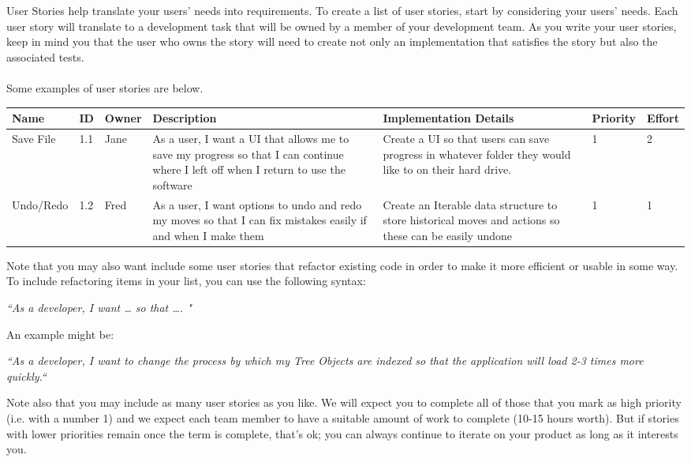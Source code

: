 \documentclass[12pt]{article}
\begin{document}
User Stories help translate your users’ needs into requirements. To create a list of user stories, start by considering your users’ needs. Each user story will translate to a development task that will be owned by a member of your development team. As you write your user stories, keep in mind you that the user who owns the story will need to create not only an implementation that satisfies the story but also the associated tests.\\
\\
Some examples of user stories are below.
    \begin{center}
      \begin{tabular}{|p{2cm}|p{0.5cm}|p{1.5cm}|p{3cm}|p{3.5cm}|p{1.75cm}|p{1.25cm}|}
        \hline
        \textbf{Name}&\textbf{ID} &\textbf{Owner}&\textbf{Description}&\textbf{Implementation Details}&\textbf{Priority}&\textbf{Effort}
        \\\hline    
        Save File	
        &1.1
        &Jane
        &As a user, I want a UI that allows me to save my progress so that I can continue where I left off when I return to use the software	
        &Create a UI so that users can save progress in whatever folder they would like to on their hard drive.
        &1
        &2
        \\\hline    
        Undo/Redo	
        &1.2
        &Fred
        &As a user, I want options to undo and redo my moves so that I can fix mistakes easily if and when I make them
        &Create an Iterable data structure to store historical moves and actions so these can be easily undone
        &1
        &1      
        \\\hline           
      \end{tabular}
    \end{center}
\noindent Note that you may also want include some user stories that refactor existing code in order to make it more efficient or usable in some way. To include refactoring items in your list, you can use the following syntax:
\begin{center}
\textit{“As a developer, I want … so that …. "} 
\end{center}
An example might be:
\begin{center}
\textit{“As a developer, I want to change the process by which my Tree Objects are indexed so that the application will load 2-3 times more quickly.“} 
\end{center}
Note also that you may include as many user stories as you like.  We will expect you to complete all of those that you mark as high priority (i.e. with a number 1) and we expect each team member to have a suitable amount of work to complete (10-15 hours worth).  But if stories with lower priorities remain once the term is complete, that’s ok; you can always continue to iterate on your product as long as it interests you.
\newpage
\end{document}
